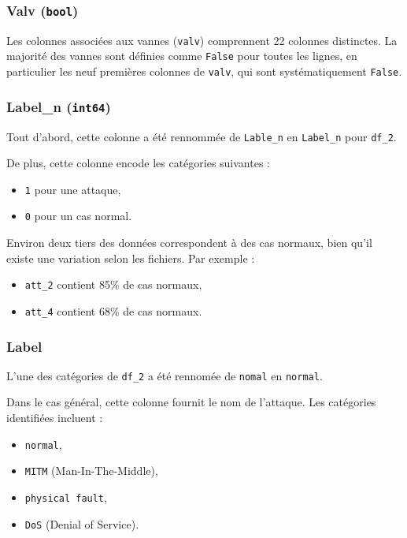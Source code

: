 \subsubsection*{Valv (\texttt{bool})}
Les colonnes associées aux vannes (\texttt{valv}) comprennent 22 colonnes distinctes. La majorité des vannes sont définies comme \texttt{False} pour toutes les lignes, en particulier les neuf premières colonnes de \texttt{valv}, qui sont systématiquement \texttt{False}.

\subsubsection*{Label\_n (\texttt{int64})}
Tout d'abord, cette colonne a été rennommée de \texttt{Lable\_n} en \texttt{Label\_n} pour \texttt{df\_2}.

De plus, cette colonne encode les catégories suivantes :
\begin{itemize}
    \item \texttt{1} pour une attaque,
    \item \texttt{0} pour un cas normal.
\end{itemize}
Environ deux tiers des données correspondent à des cas normaux, bien qu'il existe une variation selon les fichiers. Par exemple :
\begin{itemize}
    \item \texttt{att\_2} contient 85\% de cas normaux,
    \item \texttt{att\_4} contient 68\% de cas normaux.
\end{itemize}

\subsubsection*{Label}
L'une des catégories de \texttt{df\_2} a été rennomée de \texttt{nomal} en \texttt{normal}.

Dans le cas général, cette colonne fournit le nom de l'attaque. Les catégories identifiées incluent :
\begin{itemize}
    \item \texttt{normal},
    \item \texttt{MITM} (Man-In-The-Middle),
    \item \texttt{physical fault},
    \item \texttt{DoS} (Denial of Service).
\end{itemize}
